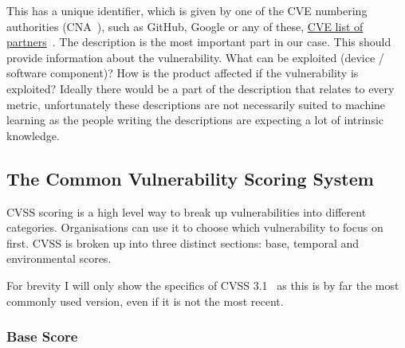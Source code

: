 \documentclass[12pt]{article}
\begin{document}
This has a unique identifier, which is given by one of the CVE numbering authorities (CNA~\cite{CNA}), such as
GitHub, Google or any of these, \href{https://www.cve.org/PartnerInformation/ListofPartners}{CVE list of
	partners}~\cite{partners}.
The description is the most important part in our case. This should provide information about the
vulnerability. What can be exploited (device / software component)? How is the product affected if
the vulnerability is exploited? Ideally there would be a part of the description that relates to every metric,
unfortunately these descriptions are not necessarily suited to machine learning as the people
writing the descriptions are expecting a lot of intrinsic knowledge.

\subsection*{The Common Vulnerability Scoring System}

CVSS scoring is a high level way to break up vulnerabilities into different categories.
Organisations can use it to choose which vulnerability to focus on first. CVSS is broken up into
three distinct sections: base, temporal and environmental scores.

For brevity I will only show the specifics of CVSS 3.1~\cite{CVSS_31} as this is by far the most commonly used
version, even if it is not the most recent.

\subsubsection*{Base Score}
\end{document}
